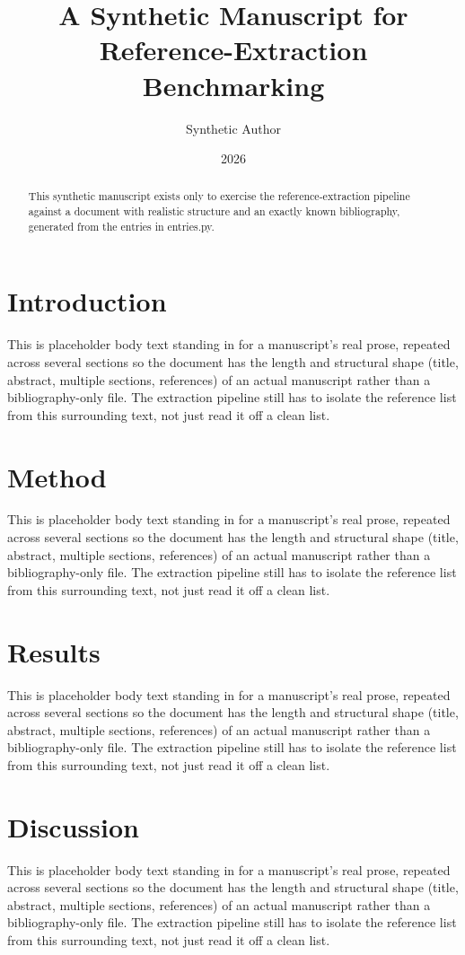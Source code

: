 \documentclass{article}
\title{A Synthetic Manuscript for Reference-Extraction Benchmarking}
\author{Synthetic Author}
\date{2026}
\begin{document}
\maketitle

\begin{abstract}
This synthetic manuscript exists only to exercise the reference-extraction pipeline against a document with realistic structure and an exactly known bibliography, generated from the entries in entries.py.
\end{abstract}

\section{Introduction}
This is placeholder body text standing in for a manuscript's real prose, repeated across several sections so the document has the length and structural shape (title, abstract, multiple sections, references) of an actual manuscript rather than a bibliography-only file. The extraction pipeline still has to isolate the reference list from this surrounding text, not just read it off a clean list.

\section{Method}
This is placeholder body text standing in for a manuscript's real prose, repeated across several sections so the document has the length and structural shape (title, abstract, multiple sections, references) of an actual manuscript rather than a bibliography-only file. The extraction pipeline still has to isolate the reference list from this surrounding text, not just read it off a clean list.

\section{Results}
This is placeholder body text standing in for a manuscript's real prose, repeated across several sections so the document has the length and structural shape (title, abstract, multiple sections, references) of an actual manuscript rather than a bibliography-only file. The extraction pipeline still has to isolate the reference list from this surrounding text, not just read it off a clean list.

\section{Discussion}
This is placeholder body text standing in for a manuscript's real prose, repeated across several sections so the document has the length and structural shape (title, abstract, multiple sections, references) of an actual manuscript rather than a bibliography-only file. The extraction pipeline still has to isolate the reference list from this surrounding text, not just read it off a clean list.

\nocite{*}
\printbibliography
\end{document}
